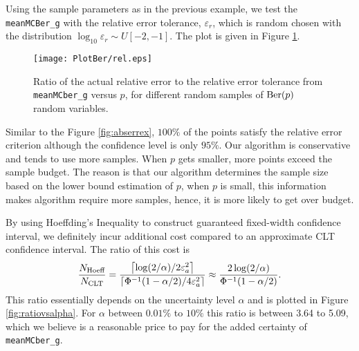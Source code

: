\documentclass{iitthesis}
\theoremstyle{definition}
\begin{document}
Using the sample parameters as in the previous example, we test the {\tt meanMCBer\_g} with the relative error tolerance, $\varepsilon_r$, which is random chosen with the distribution $\log_{10} \varepsilon_r \sim U[-2,-1]$. The plot is given in Figure \ref{fig:relerrex}.
  \begin{figure}[htbp]
    \centering
    \texttt{[image: PlotBer/rel.eps]} %
    \caption{Ratio of the actual relative error to the relative error tolerance from {\tt meanMCber\_g} versus $p$, for different random samples of $\operatorname{Ber}(p)$ random variables.}
    \label{fig:relerrex}
 \end{figure}
Similar to the Figure \ref{fig:abserrex}, $100\%$ of the points satisfy the relative error criterion although the confidence level is only $95\%$. Our algorithm is conservative and tends to use more samples. When $p$ gets smaller, more points exceed the sample budget. The reason is that our algorithm determines the sample size based on the lower bound estimation of $p$, when $p$ is small, this information makes algorithm require more samples, hence, it is more likely to get over budget.


By using Hoeffding's Inequality to construct guaranteed fixed-width confidence interval, we definitely incur additional cost compared to an approximate CLT confidence interval.  The ratio of this cost is 
\begin{equation}
\frac{N_{\text{Hoeff}}}{N_{\text{CLT}}} = \frac{\left \lceil \log(2/\alpha)/{2\varepsilon_a^2} \right \rceil}{\left \lceil{ \Phi^{-1}(1-\alpha/2)}/{4 \varepsilon_a^2}\right\rceil} \approx  \frac{2\log(2/\alpha)}{\Phi^{-1}(1-\alpha/2)}.
\end{equation}
This ratio essentially depends on the uncertainty level $\alpha$ and is plotted in Figure \ref{fig:ratiovsalpha}. For $\alpha$ between $0.01\%$ to $10\%$ this ratio is between 3.64 to 5.09, which we believe is a reasonable price to pay for the added certainty of {\tt meanMCber\_g}.
\end{document}
